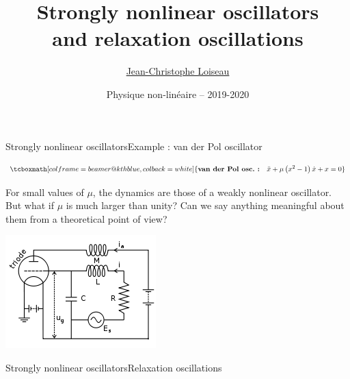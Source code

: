 \documentclass[usenames,dvipsnames,svgnames,10pt,aspectratio=169]{beamer}
\title[Nonlinear physics] %
{
	Strongly nonlinear oscillators \\
  and relaxation oscillations
}
\author[J.-Ch.~Loiseau] %
{
	\underline{Jean-Christophe Loiseau}
}
\institute[unused]
{
	\url{jean-christophe.loiseau@ensam.eu} \\
	Laboratoire DynFluid \\
	Arts et M\'etiers, France.
}
\date[unused]{Physique non-lin\'eaire -- 2019-2020}
\begin{document}
\titleframe	%


\begin{frame}[t, c]{Strongly nonlinear oscillators}{Example : van der Pol oscillator}

  \begin{minipage}{.68\textwidth}
    \[
    \tcboxmath[colframe=beamer@kthblue, colback=white]{
      \textbf{van der Pol osc.\ :} \quad \ddot{x} + \mu \left( x^2 - 1 \right) \dot{x} + x = 0
    }
    \]

    \bigskip

    For small values of $\mu$, the dynamics are those of a weakly nonlinear oscillator.
    But what if $\mu$ is much larger than unity?
    Can we say anything meaningful about them from a theoretical point of view?

  \end{minipage}%
  \hfill
  \begin{minipage}{.28\textwidth}
    \centering
    \includegraphics[width=\textwidth]{van_der_pol}
  \end{minipage}
\end{frame}





\begin{frame}[t, c]{Strongly nonlinear oscillators}{Relaxation oscillations}
  
  \centering
\end{frame}
\end{document}
